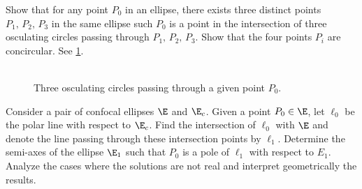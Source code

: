 \begin{exercise}
Show that  for any point $P_0$ in an ellipse, there exists three distinct points  $P_1,\, P_2,\, P_3$  in   the same ellipse such $P_0$ is a point in the intersection of three osculating circles passing through  $P_1,\, P_2,\, P_3$. Show that the four points $P_i$ are concircular.
See \cref{fig:09-3osculador}.

\end{exercise}

\begin{figure}
    \centering
    \includegraphics[width=0.7]{ii_chap_09/pics/pics_09_210_3osculador.pdf}
    \caption{Three osculating circles passing through a given point $P_0$.}
    \label{fig:09-3osculador}
\end{figure}

\begin{exercise}
Consider a pair of confocal ellipses
$\E$ and $\E_c$. Given a point $P_0\in \E$, let $\ell_0$ be the polar line with respect to $\E_c$.
Find the intersection of $\ell_0$ with $\E$ and denote the line passing through these intersection points by $\ell_1$.
Determine the semi-axes of the     ellipse $\E_1$ such that  $P_0$ is a pole of $\ell_1$ with respect to $E_1$.     Analyze the cases where the solutions are not real and interpret geometrically the results. 
\end{exercise}
    
 